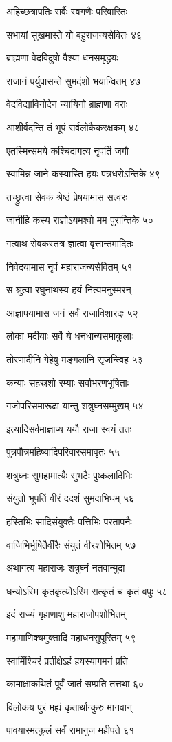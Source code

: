 अहिच्छत्रापतिः सर्वैः स्वगणैः परिवारितः

सभायां सुखमास्ते यो बहुराजन्यसेवितः ४६

ब्राह्मणा वेदविदुषो वैश्या धनसमृद्धयः

राजानं पर्युपासन्ते सुमदंशो भयान्वितम् ४७

वेदविद्याविनोदेन न्यायिनो ब्राह्मणा वराः

आशीर्वदन्ति तं भूपं सर्वलोकैकरक्षकम् ४८

एतस्मिन्समये कश्चिदागत्य नृपतिं जगौ

स्वामिन्न जाने कस्यास्ति हयः पत्रधरोऽन्तिके ४९

तच्छ्रुत्वा सेवकं श्रेष्ठं प्रेषयामास सत्वरः

जानीहि कस्य राज्ञोऽयमश्वो मम पुरान्तिके ५०

गत्वाथ सेवकस्तत्र ज्ञात्वा वृत्तान्तमादितः

निवेदयामास नृपं महाराजन्यसेवितम् ५१

स श्रुत्वा रघुनाथस्य हयं नित्यमनुस्मरन्

आज्ञापयामास जनं सर्वं राजाविशारदः ५२

लोका मदीयाः सर्वे ये धनधान्यसमाकुलाः

तोरणादीनि गेहेषु मङ्गलानि सृजन्त्विह ५३

कन्याः सहस्रशो रम्याः सर्वाभरणभूषिताः

गजोपरिसमारूढा यान्तु शत्रुघ्नसम्मुखम् ५४

इत्यादिसर्वमाज्ञाप्य ययौ राजा स्वयं ततः

पुत्रपौत्रमहिष्यादिपरिवारसमावृतः ५५

शत्रुघ्नः सुमहामात्यैः सुभटैः पुष्कलादिभिः

संयुतो भूपतिं वीरं ददर्श सुमदाभिधम् ५६

हस्तिभिः सादिसंयुक्तैः पत्तिभिः परतापनैः

वाजिभिर्भूषितैर्वीरैः संयुतं वीरशोभितम् ५७

अथागत्य महाराजः शत्रुघ्नं नतवान्मुदा

धन्योऽस्मि कृतकृत्योऽस्मि सत्कृतं च कृतं वपुः ५८

इदं राज्यं गृहाणाशु महाराजोपशोभितम्

महामाणिक्यमुक्तादि महाधनसुपूरितम् ५९

स्वामिंश्चिरं प्रतीक्षेऽहं हयस्यागमनं प्रति

कामाक्षाकथितं पूर्वं जातं सम्प्रति तत्तथा ६०

विलोकय पुरं मह्यं कृतार्थान्कुरु मानवान्

पावयास्मत्कुलं सर्वं रामानुज महीपते ६१


